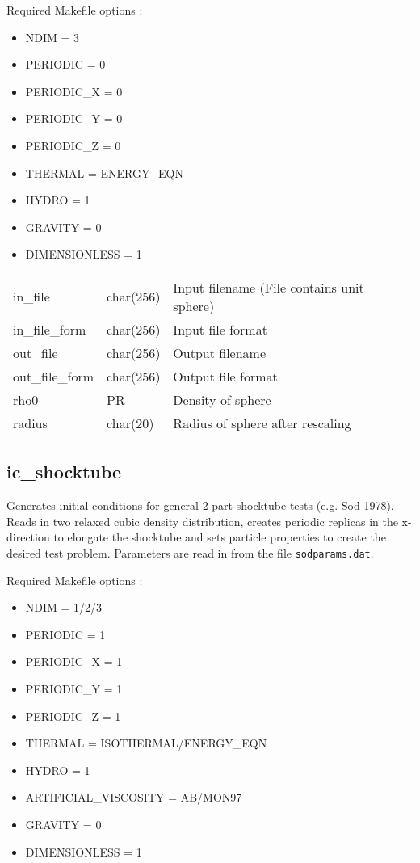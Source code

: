 \documentclass[a4paper]{article}
\newcommand{\var}[1]{\texttt{#1}}
\begin{document}
\noindent Required Makefile options :
\begin{itemize}
\item NDIM = 3
\item PERIODIC = 0
\item PERIODIC\_X = 0
\item PERIODIC\_Y = 0
\item PERIODIC\_Z = 0
\item THERMAL = ENERGY\_EQN
\item HYDRO = 1
\item GRAVITY = 0
\item DIMENSIONLESS = 1
\end{itemize}

\vspace{0.1cm}

\begin{center}
\begin{supertabular}{|p{3cm}|p{2cm}|p{8cm}|}
in\_file         & char(256) & Input filename (File contains unit sphere)\\
in\_file\_form   & char(256) & Input file format \\
out\_file        & char(256) & Output filename \\
out\_file\_form  & char(256) & Output file format \\
rho0             & PR        & Density of sphere \\
radius           & char(20)  & Radius of sphere after rescaling \\
\end{supertabular}
\end{center}

\newpage

\subsection{ic\_shocktube}
Generates initial conditions for general 2-part shocktube tests (e.g. Sod 1978). Reads in two relaxed cubic density distribution, creates periodic replicas in the x-direction to elongate the shocktube and sets particle properties to create the desired test problem.  Parameters are read in from the file \var{sodparams.dat}. \newline

\noindent Required Makefile options :
\begin{itemize}
\item NDIM = 1/2/3
\item PERIODIC = 1
\item PERIODIC\_X = 1
\item PERIODIC\_Y = 1
\item PERIODIC\_Z = 1
\item THERMAL = ISOTHERMAL/ENERGY\_EQN
\item HYDRO = 1
\item ARTIFICIAL\_VISCOSITY = AB/MON97
\item GRAVITY = 0
\item DIMENSIONLESS = 1
\end{itemize}
\end{document}
